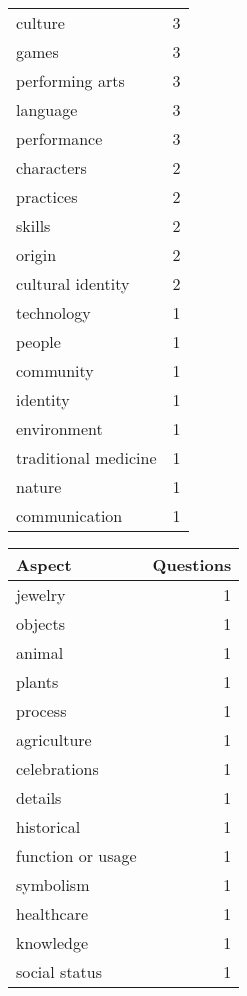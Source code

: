 \begin{table*}[ht!]
\begin{minipage}[t]{0.29\textwidth}
\begin{tabular}{lr}
            culture & 3 \\
            games & 3 \\
            performing arts & 3 \\
            language & 3 \\
            performance & 3 \\
            characters & 2 \\
            practices & 2 \\
            skills & 2 \\
            origin & 2 \\
            cultural identity & 2 \\
            technology & 1 \\
            people & 1 \\
            community & 1 \\
            identity & 1 \\
            environment & 1 \\
            traditional medicine & 1 \\
            nature & 1 \\
            communication & 1 \\
            \bottomrule
        \end{tabular}
    \end{minipage}%
    \begin{minipage}[t]{0.29\textwidth}
        \centering
        \begin{tabular}{lr}
            \toprule
            Aspect & Questions \\
            \midrule
            jewelry & 1 \\
            objects & 1 \\
            animal & 1 \\
            plants & 1 \\
            process & 1 \\
            agriculture & 1 \\
            celebrations & 1 \\
            details & 1 \\
            historical & 1 \\
            function or usage & 1 \\
            symbolism & 1 \\
            healthcare & 1 \\
            knowledge & 1 \\
            social status & 1 \\

\end{tabular}
\end{minipage}
\end{table*}
